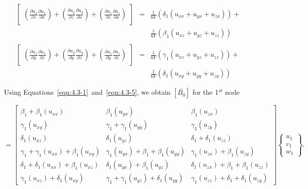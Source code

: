 \begin{equation}
\begin{array}{lll}
\begin{bmatrix}
{\left(\frac{\partial{u_{x}}}{\partial{z}}\frac{\partial{u_{x}}}{\partial{x}}\right)}
+
{\left(\frac{\partial{u_{y}}}{\partial{z}}\frac{\partial{u_{y}}}{\partial{x}}\right)}
+
{\left(\frac{\partial{u_{z}}}{\partial{z}}\frac{\partial{u_{z}}}{\partial{x}}\right)}
\end{bmatrix}
& = &  \frac{1}{6V}(\delta_{1} (u_{xx} + u_{yx} + u_{zx})) + \\
&   &  \frac{1}{6V}(\beta_{1} (u_{xz} + u_{yz} + u_{zz}))  \\ \; \\
\begin{bmatrix}
{\left(\frac{\partial{u_{x}}}{\partial{y}}\frac{\partial{u_{x}}}{\partial{z}}\right)}
+
{\left(\frac{\partial{u_{y}}}{\partial{y}}\frac{\partial{u_{y}}}{\partial{z}}\right)}
+
{\left(\frac{\partial{u_{z}}}{\partial{y}}\frac{\partial{u_{z}}}{\partial{z}}\right)}
\end{bmatrix}
& = &   \frac{1}{6V}(\gamma_{1} (u_{xz} + u_{yz} + u_{zz})) + \\
&   &   \frac{1}{6V}(\delta_{1} (u_{xy} + u_{yy} + u_{zy}))
\end{array}
\label{eqn:4.3-5}
\end{equation}


\noindent Using Equations~\ref{eqn:4.3-1}~and~\ref{eqn:4.3-5}, we obtain $[\bar{B_{0}}]$ for the 1$^{st}$ node

\begin{equation}
[\bar{B}_{0_1}]
 =
\begin{bmatrix}
\beta_{1} + \beta_{1}(u_{xx})  & \beta_{1}(u_{yx}) & \beta_{1}(u_{zx}) \\
\gamma_{1}(u_{xy}) & \gamma_{1} + \gamma_{1}(u_{yy}) & \gamma_{1}(u_{zy}) \\
\delta_{1}(u_{xz}) & \delta_{1}(u_{yz}) & \delta_{1} + \delta_{1}(u_{zz}) \\
\gamma_{1} + \gamma_{1}(u_{xx}) + \beta_{1}(u_{xy}) & \gamma_{1}(u_{yx}) + \beta_{1} + \beta_{1}(u_{yy}) & \gamma_{1}(u_{zx}) + \beta_{1}(u_{zy}) \\
\delta_{1} + \delta_{1}(u_{xx}) + \beta_{1}(u_{xz}) & \delta_{1}(u_{yx}) + \beta_{1}(u_{yz})  & \delta_{1}(u_{zx}) + \beta_{1} + \beta_{1}(u_{zz}) \\
\gamma_{1}(u_{xz}) + \delta_{1}(u_{xy}) & \gamma_{1} + \gamma_{1}(u_{yz}) + \delta_{1}(u_{yy}) & \gamma_{1}(u_{zz}) + \delta_{1} + \delta_{1}(u_{zy})
\end{bmatrix}
\begin{Bmatrix}
u_{1} \\
v_{1} \\
w_{1}
\end{Bmatrix}.
 \label{eqn:4.3-6}
\end{equation}

